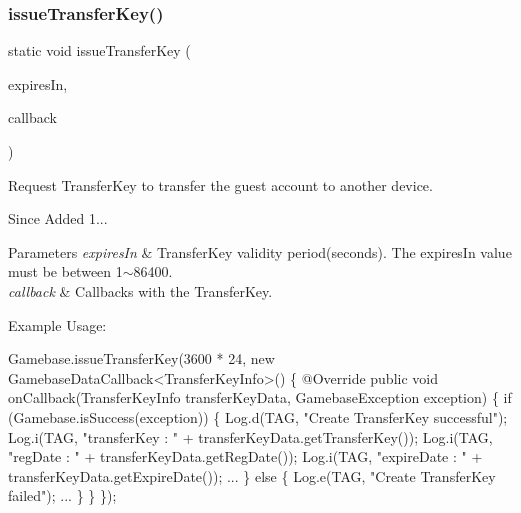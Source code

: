 \subsubsection{\texorpdfstring{issue\+Transfer\+Key()}{issueTransferKey()}}
{\footnotesize\ttfamily static void issue\+Transfer\+Key (\begin{DoxyParamCaption}\item[{final long}]{expires\+In,  }\item[{final \hyperlink{interfacecom_1_1toast_1_1android_1_1gamebase_1_1_gamebase_data_callback}{Gamebase\+Data\+Callback}$<$ \hyperlink{classcom_1_1toast_1_1android_1_1gamebase_1_1auth_1_1data_1_1_transfer_key_info}{Transfer\+Key\+Info} $>$}]{callback }\end{DoxyParamCaption})\hspace{0.3cm}{\ttfamily [static]}}



Request Transfer\+Key to transfer the guest account to another device. 

\begin{DoxySince}{Since}
Added 1... 
\end{DoxySince}

\begin{DoxyParams}{Parameters}
{\em expires\+In} & Transfer\+Key validity period(seconds). The expires\+In value must be between 1$\sim$86400. \\
\hline
{\em callback} & Callbacks with the Transfer\+Key.\\
\hline
\end{DoxyParams}
Example Usage\+: 
\begin{DoxyCode}
Gamebase.issueTransferKey(3600 * 24, \textcolor{keyword}{new} GamebaseDataCallback<TransferKeyInfo>() \{
    @Override
    \textcolor{keyword}{public} \textcolor{keywordtype}{void} onCallback(TransferKeyInfo transferKeyData, GamebaseException exception) \{
        \textcolor{keywordflow}{if} (Gamebase.isSuccess(exception)) \{
            Log.d(TAG, \textcolor{stringliteral}{"Create TransferKey successful"});
            Log.i(TAG, \textcolor{stringliteral}{"transferKey : "} + transferKeyData.getTransferKey());
            Log.i(TAG, \textcolor{stringliteral}{"regDate : "} + transferKeyData.getRegDate());
            Log.i(TAG, \textcolor{stringliteral}{"expireDate : "} + transferKeyData.getExpireDate());
            ...
        \} \textcolor{keywordflow}{else} \{
            Log.e(TAG, \textcolor{stringliteral}{"Create TransferKey failed"});
            ...
        \}
    \}
\});
\end{DoxyCode}


